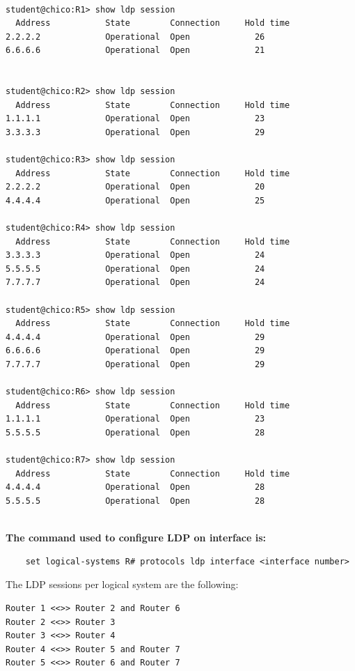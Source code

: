 \documentclass[a4paper]{article}
\begin{document}
\begin{verbatim}
    
student@chico:R1> show ldp session             
  Address           State        Connection     Hold time
2.2.2.2             Operational  Open             26
6.6.6.6             Operational  Open             21


student@chico:R2> show ldp session             
  Address           State        Connection     Hold time
1.1.1.1             Operational  Open             23
3.3.3.3             Operational  Open             29

student@chico:R3> show ldp session             
  Address           State        Connection     Hold time
2.2.2.2             Operational  Open             20
4.4.4.4             Operational  Open             25
    
student@chico:R4> show ldp session             
  Address           State        Connection     Hold time
3.3.3.3             Operational  Open             24
5.5.5.5             Operational  Open             24
7.7.7.7             Operational  Open             24

student@chico:R5> show ldp session             
  Address           State        Connection     Hold time
4.4.4.4             Operational  Open             29
6.6.6.6             Operational  Open             29
7.7.7.7             Operational  Open             29

student@chico:R6> show ldp session             
  Address           State        Connection     Hold time
1.1.1.1             Operational  Open             23
5.5.5.5             Operational  Open             28

student@chico:R7> show ldp session 
  Address           State        Connection     Hold time
4.4.4.4             Operational  Open             28
5.5.5.5             Operational  Open             28


\end{verbatim}


\textbf{The command used to configure LDP on interface is:}

\begin{verbatim}
    set logical-systems R# protocols ldp interface <interface number>
\end{verbatim}


The LDP sessions per logical system are the following:

\begin{verbatim}
Router 1 <<>> Router 2 and Router 6
Router 2 <<>> Router 3
Router 3 <<>> Router 4
Router 4 <<>> Router 5 and Router 7
Router 5 <<>> Router 6 and Router 7
\end{verbatim}
\end{document}
